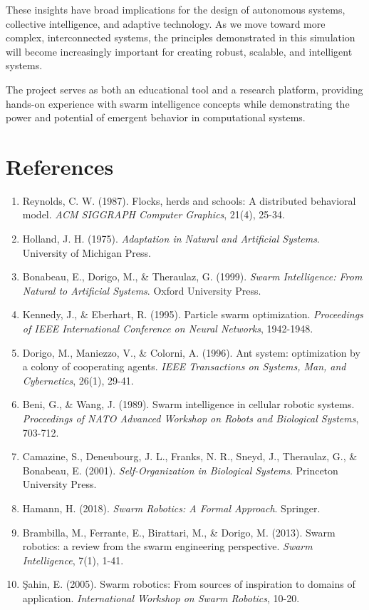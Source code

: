 \documentclass[12pt,a4paper]{article}
\begin{document}
These insights have broad implications for the design of autonomous systems, collective intelligence, and adaptive technology. As we move toward more complex, interconnected systems, the principles demonstrated in this simulation will become increasingly important for creating robust, scalable, and intelligent systems.

The project serves as both an educational tool and a research platform, providing hands-on experience with swarm intelligence concepts while demonstrating the power and potential of emergent behavior in computational systems.

\section{References}

\begin{enumerate}
    \item Reynolds, C. W. (1987). Flocks, herds and schools: A distributed behavioral model. \textit{ACM SIGGRAPH Computer Graphics}, 21(4), 25-34.
    \item Holland, J. H. (1975). \textit{Adaptation in Natural and Artificial Systems}. University of Michigan Press.
    \item Bonabeau, E., Dorigo, M., \& Theraulaz, G. (1999). \textit{Swarm Intelligence: From Natural to Artificial Systems}. Oxford University Press.
    \item Kennedy, J., \& Eberhart, R. (1995). Particle swarm optimization. \textit{Proceedings of IEEE International Conference on Neural Networks}, 1942-1948.
    \item Dorigo, M., Maniezzo, V., \& Colorni, A. (1996). Ant system: optimization by a colony of cooperating agents. \textit{IEEE Transactions on Systems, Man, and Cybernetics}, 26(1), 29-41.
    \item Beni, G., \& Wang, J. (1989). Swarm intelligence in cellular robotic systems. \textit{Proceedings of NATO Advanced Workshop on Robots and Biological Systems}, 703-712.
    \item Camazine, S., Deneubourg, J. L., Franks, N. R., Sneyd, J., Theraulaz, G., \& Bonabeau, E. (2001). \textit{Self-Organization in Biological Systems}. Princeton University Press.
    \item Hamann, H. (2018). \textit{Swarm Robotics: A Formal Approach}. Springer.
    \item Brambilla, M., Ferrante, E., Birattari, M., \& Dorigo, M. (2013). Swarm robotics: a review from the swarm engineering perspective. \textit{Swarm Intelligence}, 7(1), 1-41.
    \item Şahin, E. (2005). Swarm robotics: From sources of inspiration to domains of application. \textit{International Workshop on Swarm Robotics}, 10-20.
\end{enumerate}
\end{document}
